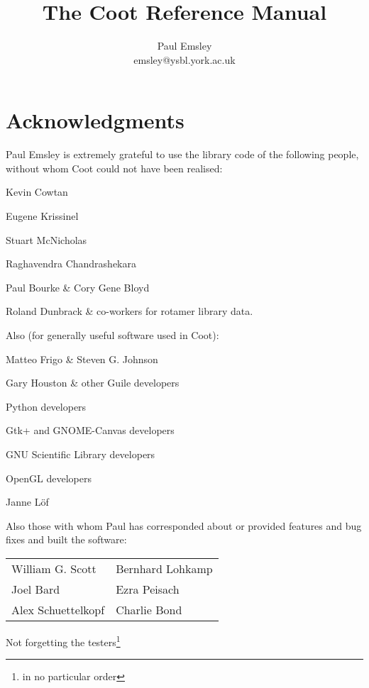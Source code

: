 \documentclass{book}
\title{The Coot Reference Manual}
\author{Paul Emsley \\\textsf{\small emsley@ysbl.york.ac.uk}}
\begin{document}
\maketitle
\tableofcontents

\chapter{Acknowledgments}
Paul Emsley is extremely grateful to use the library code of the
following people, without whom Coot could not have been realised:

\begin{trivlist}
\item Kevin Cowtan
\item Eugene Krissinel
\item Stuart McNicholas
\item Raghavendra Chandrashekara
\item Paul Bourke \& Cory Gene Bloyd
\end{trivlist}

Roland Dunbrack \& co-workers for rotamer library data.

Also (for generally useful software used in Coot):

\begin{trivlist}
\item Matteo Frigo \& Steven G. Johnson
\item Gary Houston \& other Guile developers
\item Python developers
\item Gtk+ and GNOME-Canvas developers
\item GNU Scientific Library developers
\item OpenGL developers
\item Janne L\"of
\end{trivlist}

Also those with whom Paul has corresponded about or provided
features and bug fixes and built the software:

\begin{tabular}{ll}
 William G. Scott & Bernhard Lohkamp \\
 Joel Bard  & Ezra Peisach           \\
 Alex Schuettelkopf & Charlie Bond 
\end{tabular}

Not forgetting the testers\footnote{in no particular order}
\end{document}
